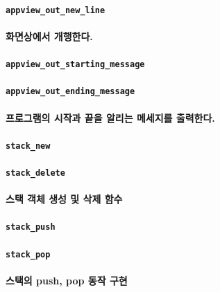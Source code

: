 \documentclass[UTF8]{report}
\begin{document}
            \paragraph{\texttt{appview\_out\_new\_line}}
            \paragraph{%
                \normalfont 화면상에서 개행한다.
            }

            \paragraph{\texttt{appview\_out\_starting\_message}}
            \paragraph{\texttt{appview\_out\_ending\_message}}
            \paragraph{%
                \normalfont 프로그램의 시작과 끝을 알리는 메세지를 출력한다.
            }

            \paragraph{\texttt{stack\_new}}
            \paragraph{\texttt{stack\_delete}}
            \paragraph{%
                \normalfont 스택 객체 생성 및 삭제 함수
            }

            \paragraph{\texttt{stack\_push}}
            \paragraph{\texttt{stack\_pop}}
            \paragraph{%
                \normalfont 스택의 push, pop 동작 구현
            }
\end{document}
